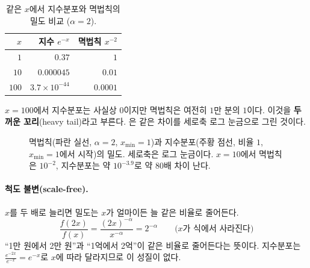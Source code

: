 \documentclass[11pt]{article}
\newcommand{\term}[1]{\textbf{#1}}
\begin{document}
\begin{table}[H]
  \centering
  \caption{같은 $x$에서 지수분포와 멱법칙의 밀도 비교 ($\alpha = 2$).}
  \label{tab:tail}
  \begin{tabular}{rrr}
    \toprule
    $x$ & 지수 $e^{-x}$ & 멱법칙 $x^{-2}$ \\
    \midrule
    $1$ & $0.37$ & $1$ \\
    \midrule
    $10$ & $0.000045$ & $0.01$ \\
    \midrule
    $100$ & $3.7 \times 10^{-44}$ & $0.0001$ \\
    \bottomrule
  \end{tabular}
\end{table}

$x = 100$에서 지수분포는 사실상 $0$이지만 멱법칙은 여전히 $1$만 분의 $1$이다.
이것을 \term{두꺼운 꼬리}(heavy tail)라고 부른다. 은 같은 차이를
세로축 로그 눈금으로 그린 것이다.

\begin{figure}[H]
  \centering
  \caption{멱법칙(파란 실선, $\alpha = 2$, $x_{\min} = 1$)과 지수분포(주황 점선,
    비율 $1$, $x_{\min} = 1$에서 시작)의 밀도. 세로축은 로그 눈금이다.
    $x = 10$에서 멱법칙은 $10^{-2}$, 지수분포는 약 $10^{-3.9}$로 약 $80$배 차이 난다.}
  \label{fig:tail}
\end{figure}

\paragraph{척도 불변(scale-free).}
$x$를 두 배로 늘리면 밀도는 $x$가 얼마이든 늘 같은 비율로 줄어든다.
\[
  \frac{f(2x)}{f(x)} = \frac{(2x)^{-\alpha}}{x^{-\alpha}} = 2^{-\alpha}
  \qquad \text{($x$가 식에서 사라진다)}
\]
``1만 원에서 2만 원''과 ``1억에서 2억''이 같은 비율로 줄어든다는 뜻이다.
지수분포는 $\frac{e^{-2x}}{e^{-x}} = e^{-x}$로 $x$에 따라 달라지므로 이 성질이 없다.
\end{document}
